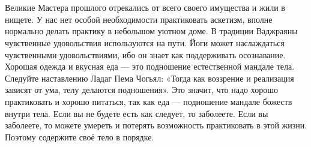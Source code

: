\\ \\ Великие Мастера прошлого отрекались от всего своего имущества и жили в нищете. У нас нет особой необходимости практиковать аскетизм, вполне нормально делать практику в небольшом уютном доме. В традиции Ваджраяны чувственные удовольствия используются на пути. Йоги может наслаждаться чувственными удовольствиями, ибо он знает как поддерживать осознавание. Хорошая одежда и вкусная еда — это подношение естественной мандале тела. Следуйте наставлению Ладаг Пема Чогьял: «Тогда как воззрение и реализация зависят от ума, телу делаются подношения». Это значит, что надо хорошо практиковать и хорошо питаться, так как еда — подношение мандале божеств внутри тела. Если вы не будете есть как следует, то заболеете. Если вы заболеете, то можете умереть и потерять возможность практиковать в этой жизни. Поэтому содержите своё тело в порядке.
